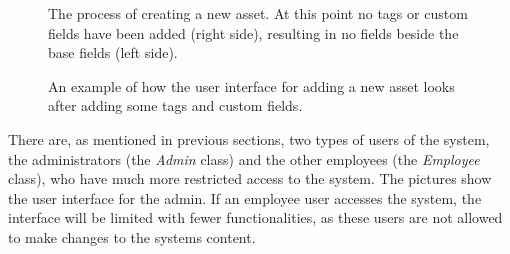 \begin{figure}[H]
    \centering
    \caption{The process of creating a new asset. At this point no tags or custom fields have been added (right side), resulting in no fields beside the base fields (left side).}
    \label{fig:add_asset_no_tags}
\end{figure}

\begin{figure}[H]
    \centering
    \caption{An example of how the user interface for adding a new asset looks after adding some tags and custom fields.}
    \label{fig:add_asset_with_tags}
\end{figure}

There are, as mentioned in previous sections, two types of users of the system, the administrators (the \textit{Admin} class) and the other employees (the \textit{Employee} class), who have much more restricted access to the system. The pictures show the user interface for the admin. If an employee user accesses the system, the interface will be limited with fewer functionalities, as these users are not allowed to make changes to the systems content.